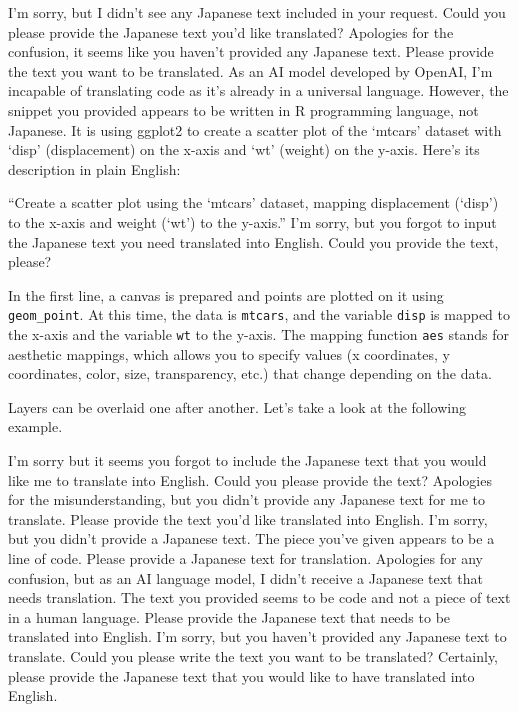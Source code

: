 \documentclass[
  a4paper,
]{book}
\begin{document}
I'm sorry, but I didn't see any Japanese text included in your request.
Could you please provide the Japanese text you'd like translated?
Apologies for the confusion, it seems like you haven't provided any
Japanese text. Please provide the text you want to be translated. As an
AI model developed by OpenAI, I'm incapable of translating code as it's
already in a universal language. However, the snippet you provided
appears to be written in R programming language, not Japanese. It is
using ggplot2 to create a scatter plot of the `mtcars' dataset with
`disp' (displacement) on the x-axis and `wt' (weight) on the y-axis.
Here's its description in plain English:

``Create a scatter plot using the `mtcars' dataset, mapping displacement
(`disp') to the x-axis and weight (`wt') to the y-axis.'' I'm sorry, but
you forgot to input the Japanese text you need translated into English.
Could you provide the text, please?

In the first line, a canvas is prepared and points are plotted on it
using \texttt{geom\_point}. At this time, the data is \texttt{mtcars},
and the variable \texttt{disp} is mapped to the x-axis and the variable
\texttt{wt} to the y-axis. The mapping function \texttt{aes} stands for
aesthetic mappings, which allows you to specify values (x coordinates, y
coordinates, color, size, transparency, etc.) that change depending on
the data.

Layers can be overlaid one after another. Let's take a look at the
following example.

I'm sorry but it seems you forgot to include the Japanese text that you
would like me to translate into English. Could you please provide the
text? Apologies for the misunderstanding, but you didn't provide any
Japanese text for me to translate. Please provide the text you'd like
translated into English. I'm sorry, but you didn't provide a Japanese
text. The piece you've given appears to be a line of code. Please
provide a Japanese text for translation. Apologies for any confusion,
but as an AI language model, I didn't receive a Japanese text that needs
translation. The text you provided seems to be code and not a piece of
text in a human language. Please provide the Japanese text that needs to
be translated into English. I'm sorry, but you haven't provided any
Japanese text to translate. Could you please write the text you want to
be translated? Certainly, please provide the Japanese text that you
would like to have translated into English.
\end{document}
